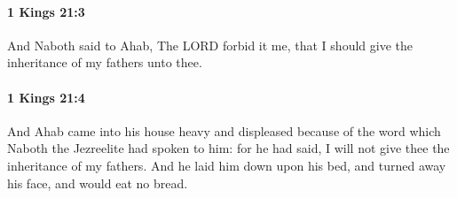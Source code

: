 		\paragraph{1 Kings 21:3} %
			\label{1KINGS-21-3}

			And Naboth said to Ahab, The LORD forbid it me, that I should give the inheritance of my fathers unto thee.


		\paragraph{1 Kings 21:4} %
			\label{1KINGS-21-4}

			And Ahab came into his house heavy and displeased because of the word which Naboth the Jezreelite had spoken to him: for he had said, I will not give thee the inheritance of my fathers. And he laid him down upon his bed, and turned away his face, and would eat no bread.

